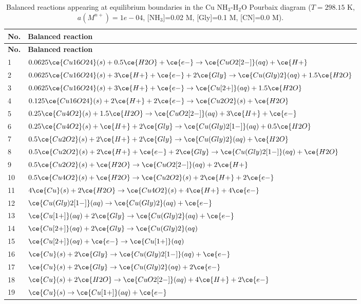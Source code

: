 \begin{longtable}{|p{0.9cm}|p{13.3cm}|}
\caption{Balanced reactions appearing at equilibrium boundaries in the Cu NH$_3$-H$_2$O Pourbaix diagram ($T=298.15$ K, $a(M^{n+})=1e-04$, [NH$_3$]=0.02 M, [Gly]=0.1 M, [CN]=0.0 M).}\\
\hline
\textbf{No.} & \textbf{Balanced reaction} \\ \hline
\endfirsthead
\hline
\textbf{No.} & \textbf{Balanced reaction} \\ \hline
\endhead
1 & $0.0625 \ce{Cu16O24}(s) + 0.5 \ce{H2O} + \ce{e-} \rightarrow \ce{CuO2[2-]}(aq) + \ce{H+}$ \\ \hline
2 & $0.0625 \ce{Cu16O24}(s) + 3 \ce{H+} + \ce{e-} + 2 \ce{Gly} \rightarrow \ce{Cu(Gly)2}(aq) + 1.5 \ce{H2O}$ \\ \hline
3 & $0.0625 \ce{Cu16O24}(s) + 3 \ce{H+} + \ce{e-} \rightarrow \ce{Cu[2+]}(aq) + 1.5 \ce{H2O}$ \\ \hline
4 & $0.125 \ce{Cu16O24}(s) + 2 \ce{H+} + 2 \ce{e-} \rightarrow \ce{Cu2O2}(s) + \ce{H2O}$ \\ \hline
5 & $0.25 \ce{Cu4O2}(s) + 1.5 \ce{H2O} \rightarrow \ce{CuO2[2-]}(aq) + 3 \ce{H+} + \ce{e-}$ \\ \hline
6 & $0.25 \ce{Cu4O2}(s) + \ce{H+} + 2 \ce{Gly} \rightarrow \ce{Cu(Gly)2[1-]}(aq) + 0.5 \ce{H2O}$ \\ \hline
7 & $0.5 \ce{Cu2O2}(s) + 2 \ce{H+} + 2 \ce{Gly} \rightarrow \ce{Cu(Gly)2}(aq) + \ce{H2O}$ \\ \hline
8 & $0.5 \ce{Cu2O2}(s) + 2 \ce{H+} + \ce{e-} + 2 \ce{Gly} \rightarrow \ce{Cu(Gly)2[1-]}(aq) + \ce{H2O}$ \\ \hline
9 & $0.5 \ce{Cu2O2}(s) + \ce{H2O} \rightarrow \ce{CuO2[2-]}(aq) + 2 \ce{H+}$ \\ \hline
10 & $0.5 \ce{Cu4O2}(s) + \ce{H2O} \rightarrow \ce{Cu2O2}(s) + 2 \ce{H+} + 2 \ce{e-}$ \\ \hline
11 & $4 \ce{Cu}(s) + 2 \ce{H2O} \rightarrow \ce{Cu4O2}(s) + 4 \ce{H+} + 4 \ce{e-}$ \\ \hline
12 & $\ce{Cu(Gly)2[1-]}(aq) \rightarrow \ce{Cu(Gly)2}(aq) + \ce{e-}$ \\ \hline
13 & $\ce{Cu[1+]}(aq) + 2 \ce{Gly} \rightarrow \ce{Cu(Gly)2}(aq) + \ce{e-}$ \\ \hline
14 & $\ce{Cu[2+]}(aq) + 2 \ce{Gly} \rightarrow \ce{Cu(Gly)2}(aq)$ \\ \hline
15 & $\ce{Cu[2+]}(aq) + \ce{e-} \rightarrow \ce{Cu[1+]}(aq)$ \\ \hline
16 & $\ce{Cu}(s) + 2 \ce{Gly} \rightarrow \ce{Cu(Gly)2[1-]}(aq) + \ce{e-}$ \\ \hline
17 & $\ce{Cu}(s) + 2 \ce{Gly} \rightarrow \ce{Cu(Gly)2}(aq) + 2 \ce{e-}$ \\ \hline
18 & $\ce{Cu}(s) + 2 \ce{H2O} \rightarrow \ce{CuO2[2-]}(aq) + 4 \ce{H+} + 2 \ce{e-}$ \\ \hline
19 & $\ce{Cu}(s) \rightarrow \ce{Cu[1+]}(aq) + \ce{e-}$ \\ \hline
\end{longtable}
